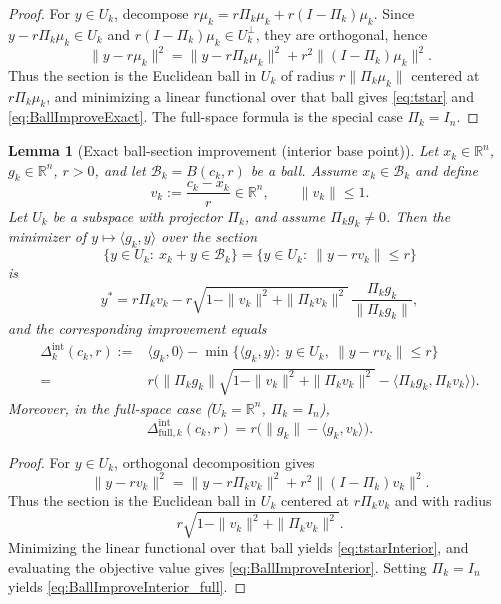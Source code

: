 \documentclass{article}
\newtheorem{lemma}{Lemma}
\begin{document}
\begin{proof}
For $y\in U_k$, decompose $r\mu_k=r\Pi_k\mu_k+r(I-\Pi_k)\mu_k$. Since $y-r\Pi_k\mu_k\in U_k$ and $r(I-\Pi_k)\mu_k\in U_k^\perp$, they are orthogonal, hence
\[
\|y-r\mu_k\|^2=\|y-r\Pi_k\mu_k\|^2+r^2\|(I-\Pi_k)\mu_k\|^2.
\]
Thus the section is the Euclidean ball in $U_k$ of radius $r\|\Pi_k\mu_k\|$ centered at $r\Pi_k\mu_k$, and minimizing a linear functional over that ball gives \eqref{eq:tstar} and \eqref{eq:BallImproveExact}. The full-space formula is the special case $\Pi_k=I_n$.
\end{proof}

\begin{lemma}[Exact ball-section improvement (interior base point)]
\label{lem:ballSectionInterior_clean}
Let $x_k\in\mathbb R^n$, $g_k\in\mathbb R^n$, $r>0$, and let $\mathcal B_k=B(c_k,r)$ be a ball. Assume $x_k\in \mathcal B_k$ and define
\begin{equation}
v_k:=\frac{c_k-x_k}{r}\in\mathbb R^n,
\qquad \|v_k\|\le 1.
\label{eq:vInteriorDef}
\end{equation}
Let $U_k$ be a subspace with projector $\Pi_k$, and assume $\Pi_k g_k\neq 0$. Then the minimizer of $y\mapsto \langle g_k,y\rangle$ over the section
\begin{equation}
\{y\in U_k:\ x_k+y\in \mathcal B_k\}=\{y\in U_k:\ \|y-rv_k\|\le r\}
\label{eq:SectionSetInterior}
\end{equation}
is
\begin{equation}
y^*=r\Pi_k v_k-r\sqrt{1-\|v_k\|^2+\|\Pi_k v_k\|^2}\,\frac{\Pi_k g_k}{\|\Pi_k g_k\|},
\label{eq:tstarInterior}
\end{equation}
and the corresponding improvement equals
\begin{align}
\Delta_{k}^{\mathrm{int}}(c_k,r)
:=&
\langle g_k,0\rangle-\min\{\langle g_k,y\rangle:\ y\in U_k,\ \|y-rv_k\|\le r\}\\
=&
r\Big(\|\Pi_k g_k\|\sqrt{1-\|v_k\|^2+\|\Pi_k v_k\|^2}-\langle \Pi_k g_k,\Pi_k v_k\rangle\Big).
\label{eq:BallImproveInterior}
\end{align}
Moreover, in the full-space case ($U_k=\mathbb R^n$, $\Pi_k=I_n$),
\begin{equation}
\Delta_{\mathrm{full},k}^{\mathrm{int}}(c_k,r)
=
r\Big(\|g_k\|-\langle g_k,v_k\rangle\Big).
\label{eq:BallImproveInterior_full}
\end{equation}
\end{lemma}

\begin{proof}
For $y\in U_k$, orthogonal decomposition gives
\[
\|y-rv_k\|^2=\|y-r\Pi_k v_k\|^2+r^2\|(I-\Pi_k)v_k\|^2.
\]
Thus the section is the Euclidean ball in $U_k$ centered at $r\Pi_k v_k$ and with radius
\[
r\sqrt{1-\|v_k\|^2+\|\Pi_k v_k\|^2}.
\]
Minimizing the linear functional over that ball yields \eqref{eq:tstarInterior}, and evaluating the objective value gives \eqref{eq:BallImproveInterior}. Setting $\Pi_k=I_n$ yields \eqref{eq:BallImproveInterior_full}.
\end{proof}
\end{document}
